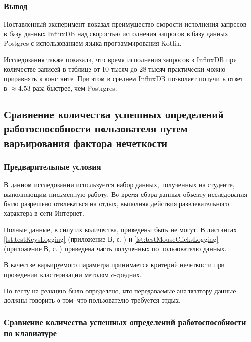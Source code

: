 \subsubsection*{Вывод}

Поставленный эксперимент показал преимущество скорости исполнения запросов в базу данных InfluxDB над скоростью исполнения запросов в базу данных Postgres с использованием языка программирования Kotlin.

Исследования также показали, что время исполнения запросов в InfluxDB при количестве записей в таблице от 10 тысяч до 28 тысяч практически можно приравнять к константе. При этом в среднем InfluxDB позволяет получить ответ в $\approx 4.53$ раза быстрее, чем Postrgres.

\subsection{Сравнение количества успешных определений работоспособности пользователя путем варьирования фактора нечеткости}

\subsubsection{Предварительные условия}

В данном исследовании используется набор данных, полученных на студенте, выполняющим письменную работу. Во время сбора данных объекту исследования было разрешено отвлекаться на отдых, выполняя действия развлекательного характера в сети Интернет.

Полные данные, в силу их количества, приведены быть не могут. В листингах \ref{lst:testKeysLogging} (приложение В, с. \pageref{chp:application-c}) и \ref{lst:testMouseClicksLogging} (приложение В, с. \pageref{chp:application-c}) приведена часть полученных по пользователю данных.

В качестве варьируемого параметра принимается критерий нечеткости при проведении кластеризации методом c-средних.

По тесту на реакцию было определено, что передаваемые анализатору данные должны говорить о том, что пользователю требуется отдых.

\subsubsection[Сравнение количества успешных определений работоспособности по \newline клавиатуре]{Сравнение количества успешных определений работоспособности по клавиатуре}

